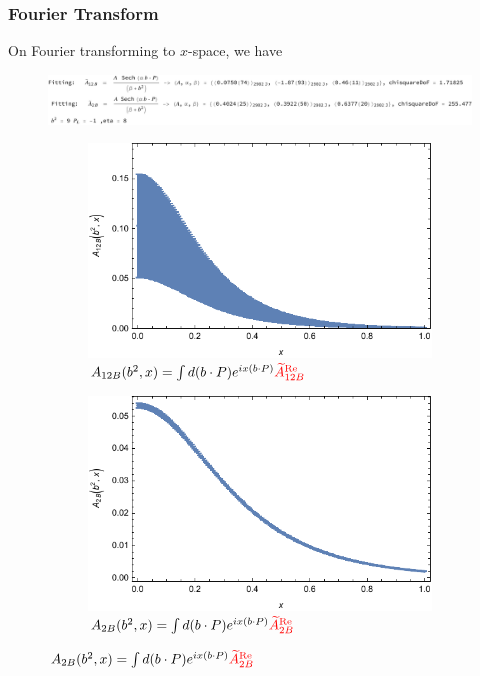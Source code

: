 \documentclass[]{article}
\numberwithin{equation}{section}
\newcommand{\tAmp}{\widetilde{A}}
\newcommand{\tAmp}{\ensuremath{\widetilde{A}^{(+)}}}
\begin{document}
\pagebreak
\subsubsection{Fourier Transform}
On Fourier transforming to $x$-space, we have
\begin{figure}[h!]
    \centering
    \includegraphics[width=0.8\linewidth]{fourierxfitvalues.pdf}
\end{figure}
\begin{figure}[h!]
     \centering
     \begin{subfigure}[b]{0.45\textwidth}
         \centering
         \includegraphics[width=\textwidth]{Fourierx_A12B_ampname_b_bnum_P1_-1_eta_8.pdf}
         \caption{$A_{12B}(b^2, x)=\int d(b\cdot P)e^{ix(b\cdot P)} \textcolor{red}{\tAmp_{12B}^{\text{Re}}}$}
     \end{subfigure}
     \begin{subfigure}[b]{0.45\textwidth}
         \centering
         \includegraphics[width=\textwidth]{Fourierx_A2B_ampname_b_bnum_P1_-1_eta_8.pdf}
         \caption{$A_{2B}(b^2, x)=\int d(b\cdot P)e^{ix(b\cdot P)} \textcolor{red}{\tAmp_{2B}^{\text{Re}}}$}
     \end{subfigure}
\end{figure}
\end{document}
